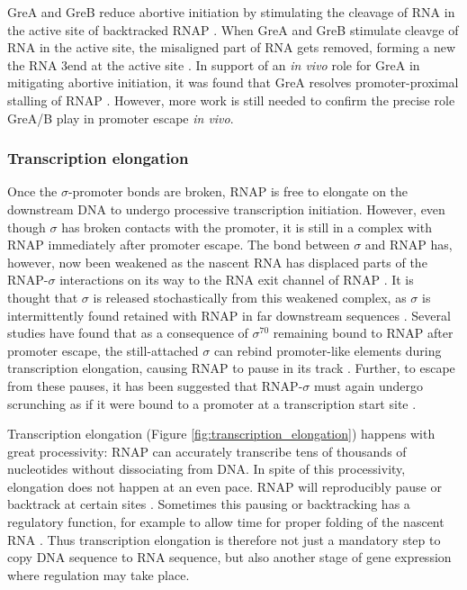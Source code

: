 GreA and GreB  reduce abortive initiation by stimulating the cleavage of RNA in
the active site of backtracked RNAP \cite{hsu_escherichia_1995}. When GreA and
GreB stimulate cleavge of RNA in the active site, the misaligned part of RNA
gets removed, forming a new the RNA 3\ppp end at the active site
\cite{toulme_grea_2000}. In support of an \textit{in vivo} role for GreA in
mitigating abortive initiation, it was found that GreA resolves
promoter-proximal stalling of RNAP \cite{kusuya_transcription_2011}. However,
more work is still needed to confirm the precise role GreA/B play in promoter
escape \textit{in vivo}.

\subsubsection{Transcription elongation}
Once the $\sigma$-promoter bonds are broken, RNAP is free to elongate on the
downstream DNA to undergo processive transcription initiation. However, even
though $\sigma$ has broken contacts with the promoter, it is still in a complex
with RNAP immediately after promoter escape. The bond between $\sigma$ and RNAP
has, however, now been weakened as the nascent RNA has displaced parts of the
RNAP-$\sigma$ interactions on its way to the RNA exit channel of RNAP
\cite{mekler_structural_2002, nickels_interaction_2005}. It is thought that
$\sigma$ is released stochastically from this weakened complex, as $\sigma$ is
intermittently found retained with RNAP in far downstream sequences
\cite{mooney_sigma_2005}. Several studies have found that as a consequence of
$\sigma^{70}$ remaining bound to RNAP after promoter escape, the still-attached
$\sigma$ can rebind promoter-like elements during transcription elongation,
causing RNAP to pause in its track \cite{ring_function_1996,
kapanidis_retention_2005, raffaelle_holoenzyme_2005}. Further, to escape from
these pauses, it has been suggested that RNAP-$\sigma$ must again undergo
scrunching as if it were bound to a promoter at a transcription start site
\cite{zhilina_structural_2012}.

Transcription elongation (Figure \ref{fig:transcription_elongation}) happens
with great processivity: RNAP can accurately transcribe tens of thousands of
nucleotides without dissociating from DNA. In spite of this processivity,
elongation does not happen at an even pace. RNAP will reproducibly pause or
backtrack at certain sites \cite{herbert_sequence-resolved_2006}. Sometimes
this pausing or backtracking has a regulatory function, for example to allow
time for proper folding of the nascent RNA \cite{landick_r_regulatory_2006}.
Thus transcription elongation is therefore not just a mandatory step to copy
DNA sequence to RNA sequence, but also another stage of gene expression where
regulation may take place.


